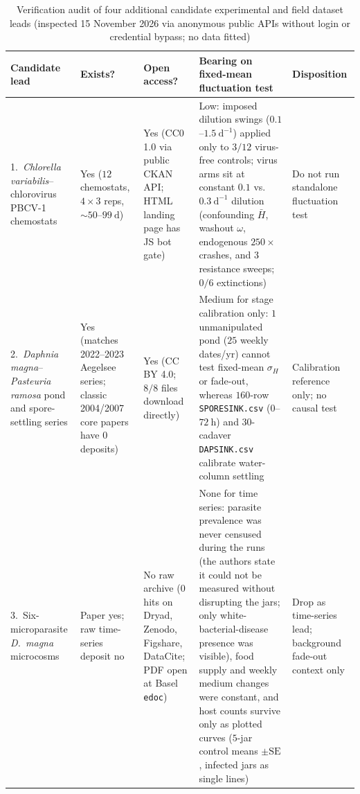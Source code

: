 \begin{table}[htbp]
\caption{Verification audit of four additional candidate experimental and field dataset leads (inspected 15 November 2026 via anonymous public APIs without login or credential bypass; no data fitted)}\label{num-tab-esm-leads}
{\scriptsize\setlength{\tabcolsep}{3pt}\renewcommand{\arraystretch}{1.14}
\begin{tabular}{@{}p{}p{}p{}p{}p{}@{}}
\toprule
Candidate lead & Exists? & Open access? & Bearing on fixed-mean fluctuation test & Disposition \\
\midrule
1.\ \textit{Chlorella variabilis}--chlorovirus PBCV-1 chemostats \citep[Eawag ERIC \texttt{doi:10.25678/0007HK};][]{lepennec2024} & Yes ($12$ chemostats, $4 \times 3$ reps, $\sim 50$--$99\ \mathrm{d}$) & Yes (CC0 1.0 via public CKAN API; HTML landing page has JS bot gate) & Low: imposed dilution swings ($0.1$--$1.5\ \mathrm{d}^{-1}$) applied only to $3/12$ virus-free controls; virus arms sit at constant $0.1$ vs.\ $0.3\ \mathrm{d}^{-1}$ dilution (confounding $\bar{H}$, washout $\omega$, endogenous $250\times$ crashes, and $3$ resistance sweeps; $0/6$ extinctions) & Do not run standalone fluctuation test \\
2.\ \textit{Daphnia magna}--\textit{Pasteuria ramosa} pond and spore-settling series \citep[Figshare \texttt{doi:10.6084/m9.figshare.29559692.v1};][]{tadiri2026} & Yes (matches 2022--2023 Aegelsee series; classic 2004/2007 core papers have $0$ deposits) & Yes (CC BY 4.0; $8/8$ files download directly) & Medium for stage calibration only: $1$ unmanipulated pond ($25$ weekly dates/yr) cannot test fixed-mean $\sigma_H$ or fade-out, whereas $160$-row \texttt{SPORESINK.csv} ($0$--$72\ \mathrm{h}$) and $30$-cadaver \texttt{DAPSINK.csv} calibrate water-column settling & Calibration reference only; no causal test \\
3.\ Six-microparasite \textit{D.~magna} microcosms \citep[\texttt{doi:10.1086/303404};][]{ebert2000} & Paper yes; raw time-series deposit no & No raw archive ($0$ hits on Dryad, Zenodo, Figshare, DataCite; PDF open at Basel \texttt{edoc}) & None for time series: parasite prevalence was never censused during the runs (the authors state it could not be measured without disrupting the jars; only white-bacterial-disease presence was visible), food supply and weekly medium changes were constant, and host counts survive only as plotted curves ($5$-jar control means $\pm\mathrm{SE}$, infected jars as single lines) & Drop as time-series lead; background fade-out context only \\

\end{tabular}}
\end{table}
